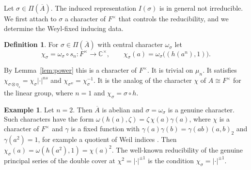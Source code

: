 \documentclass[12pt,letterpaper]{article}
\numberwithin{equation}{section}
\theoremstyle{definition}
\newtheorem{xdefinition}[theorem]{Definition}
\newtheorem{xexample}[theorem]{Example}
\newcommand{\C}{\mathbb C}
\newcommand{\bA}{\overline{A}}
\begin{document}
Let $\sigma\in\Pi(\bA)$.  The induced representation $I(\sigma)$ is in general not
irreducible.  We first attach to $\sigma$ a character of $F^\times$ that controls the
reducibility, and we determine the Weyl-fixed inducing data.

\begin{xdefinition}\label{def:chi}
For $\sigma\in\Pi(\bA)$ with central character $\omega_\sigma$ let
\[
\chi_\sigma=\omega_\sigma\circ s_n:F^\times\to\C^\times,\qquad \chi_\sigma(a)=\omega_\sigma\bigl((h(a^n),1)\bigr).
\]
\end{xdefinition}
By Lemma~\ref{lem:power} this is a character of $F^\times$.  It is trivial on $\mu_n$.  It
satisfies $\chi_{\sigma\otimes\eta_s}=\chi_\sigma|\cdot|^{ns}$ and
$\chi_{\sigma^w}=\chi_\sigma^{-1}$.  It is the analog of the character $\chi$ of
$A\cong F^\times$ for the linear group, where $n=1$ and $\chi_\sigma=\sigma\circ h$.

\begin{xexample}\label{ex:chi-n2}
Let $n=2$.  Then $\bA$ is abelian and $\sigma=\omega_\sigma$ is a genuine character.  Such
characters have the form $\omega(h(a),\zeta)=\zeta\,\chi(a)\gamma(a)$, where $\chi$ is a
character of $F^\times$ and $\gamma$ is a fixed function with
$\gamma(a)\gamma(b)=\gamma(ab)(a,b)_2$ and $\gamma(a^2)=1$, for example a quotient of Weil
indices \cite{Ge76}.  Then $\chi_\sigma(a)=\omega(h(a^2),1)=\chi(a)^2$.  The well-known
reducibility of the genuine principal series of the double cover at $\chi^2=|\cdot|^{\pm1}$
is the condition $\chi_\sigma=|\cdot|^{\pm1}$.
\end{xexample}
\end{document}
